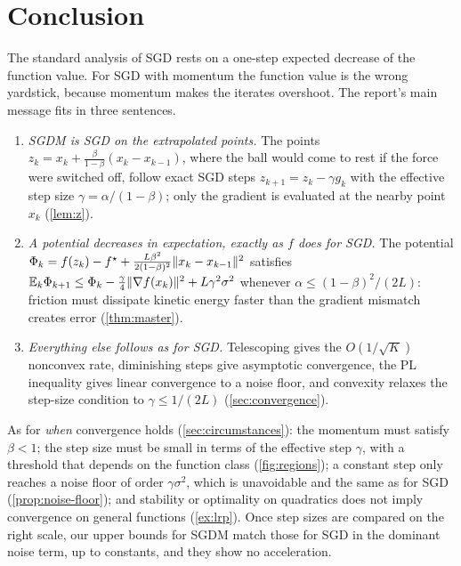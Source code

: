 \section{Conclusion}\label{sec:conclusion}

The standard analysis of SGD rests on a one-step expected decrease of the function value.
For SGD with momentum the function value is the wrong yardstick, because momentum makes
the iterates overshoot. The report's main message fits in three sentences.

\begin{enumerate}
\item \emph{SGDM is SGD on the extrapolated points.} The points
  $z_k=x_k+\frac{\beta}{1-\beta}(x_k-x_{k-1})$, where the ball would come to rest if the
  force were switched off, follow exact SGD steps $z_{k+1}=z_k-\gamma g_k$ with the effective
  step size $\gamma=\alpha/(1-\beta)$; only the gradient is evaluated at the nearby point $x_k$
  (\cref{lem:z}).
\item \emph{A potential decreases in expectation, exactly as $f$ does for SGD.} The
  potential $\Phi_k=f(z_k)-f^\star+\frac{L\beta^2}{2(1-\beta)^2}\lVert x_k-x_{k-1}\rVert^2$ satisfies
  $\mathbb{E}_k\Phi_{k+1}\le\Phi_k-\frac\gamma4\lVert \nabla f(x_k)\rVert^2+L\gamma^2\sigma^2$ whenever
  $\alpha\le(1-\beta)^2/(2L)$: friction must dissipate kinetic energy faster than the gradient
  mismatch creates error (\cref{thm:master}).
\item \emph{Everything else follows as for SGD.} Telescoping gives the $O(1/\sqrt K)$
  nonconvex rate, diminishing steps give asymptotic convergence, the PL inequality gives
  linear convergence to a noise floor, and convexity relaxes the step-size condition to
  $\gamma\le1/(2L)$ (\cref{sec:convergence}).
\end{enumerate}

As for \emph{when} convergence holds (\cref{sec:circumstances}): the momentum must satisfy
$\beta<1$; the step size must be small in terms of the effective step $\gamma$, with a
threshold that depends on the function class (\cref{fig:regions}); a constant step only
reaches a noise floor of order $\gamma\sigma^2$, which is unavoidable and the same as for SGD
(\cref{prop:noise-floor}); and stability or optimality on quadratics does not imply
convergence on general functions (\cref{ex:lrp}). Once step sizes are compared on the
right scale, our upper bounds for SGDM match those for SGD in the dominant noise term, up to
constants, and they show no acceleration.

